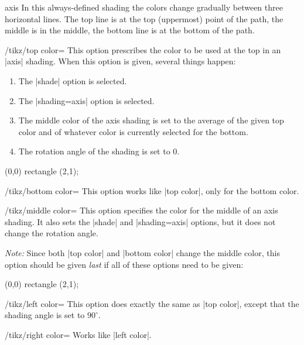 \begin{shading}{axis}
  In this always-defined shading the colors change gradually
  between three horizontal lines. The top line is at the top
  (uppermost) point of the path, the middle is in the middle, the
  bottom line is at the bottom of the path.
  
  \begin{key}{/tikz/top color=}
    This option prescribes the color to be used at the top in an |axis|
    shading. When this option is given, several things happen:
    \begin{enumerate}
    \item
      The |shade| option is selected.
    \item
      The |shading=axis| option is selected.
    \item
      The middle color of the axis shading is set to the average of the
      given top color  and of whatever color is currently
      selected for the bottom.
    \item
      The rotation angle of the shading is set to 0.
  \end{enumerate}

\begin{codeexample}[]
\tikz \draw[top color=red] (0,0) rectangle (2,1);
\end{codeexample}
  \end{key}  

  \begin{key}{/tikz/bottom color=}
    This option works like |top color|, only for the bottom color.
  \end{key}

  \begin{key}{/tikz/middle color=}
    This option specifies the color for the middle of an axis
    shading. It also sets the |shade| and |shading=axis| options, but it
    does not change the rotation angle.
    
    \emph{Note:} Since both |top color| and |bottom color| change the
    middle color, this option should be given \emph{last} if all of
    these options need to be given:
    
\begin{codeexample}[]
\tikz \draw[top color=white,bottom color=black,middle color=red]
  (0,0) rectangle (2,1);
\end{codeexample}  
  \end{key}

  \begin{key}{/tikz/left color=}
    This option does exactly the same as |top color|, except that the
    shading angle is set to $90^\circ$.
  \end{key}
  
  \begin{key}{/tikz/right color=}
    Works like |left color|.
  \end{key}
\end{shading}


